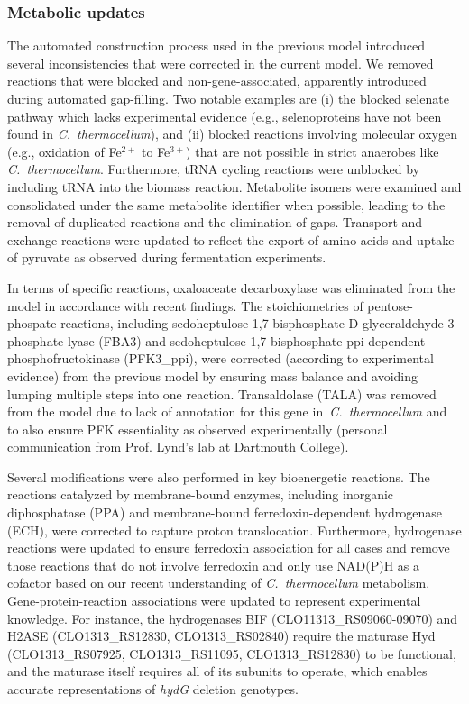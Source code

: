 \subsubsection{Metabolic updates}

The automated construction process used in the previous model introduced several inconsistencies that were corrected in the current model. We removed reactions that were blocked and non-gene-associated, apparently introduced during automated gap-filling. Two notable examples are (i) the blocked selenate pathway which lacks experimental evidence (e.g., selenoproteins have not been found in \textit{C.~thermocellum}), and (ii) blocked reactions involving molecular oxygen (e.g., oxidation of Fe$^{2+}$ to Fe$^{3+}$) that are not possible in strict anaerobes like \textit{C.~thermocellum}. Furthermore, tRNA cycling reactions were unblocked by including tRNA into the biomass reaction.\citep{reimers2017}
Metabolite isomers were examined and consolidated under the same metabolite identifier when possible, leading to the removal of duplicated reactions and the elimination of gaps.
Transport and exchange reactions were updated to reflect the export of amino acids and uptake of pyruvate as observed during fermentation experiments.\citep{holwerda2014}

In terms of specific reactions, oxaloaceate decarboxylase was eliminated from the model in accordance with recent findings.\citep{olson2017}
The stoichiometries of pentose-phospate reactions, including sedoheptulose 1,7-bisphosphate D-glyceraldehyde-3-phosphate-lyase (FBA3) and sedoheptulose 1,7-bisphosphate ppi-dependent phosphofructokinase (PFK3\_ppi), were corrected (according to experimental evidence\citep{rydzak2012}) from the previous model by ensuring mass balance and avoiding lumping multiple steps into one reaction.
Transaldolase (TALA) was removed from the model due to lack of annotation for this gene in \textit{C.~thermocellum} and to also ensure PFK essentiality as observed experimentally (personal communication from Prof. Lynd's lab at Dartmouth College).

Several modifications were also performed in key bioenergetic reactions.
The reactions catalyzed by membrane-bound enzymes, including inorganic diphosphatase (PPA) \citep{zhou2013} and
membrane-bound ferredoxin-dependent hydrogenase (ECH)\citep{calusinska2010},
were corrected to capture proton translocation.
Furthermore, hydrogenase reactions were updated to ensure ferredoxin association for all cases and remove those reactions that do not involve ferredoxin and only use NAD(P)H as a cofactor based on our recent understanding of \textit{C.~thermocellum} metabolism.\citep{biswas2017}
Gene-protein-reaction associations were updated to represent experimental knowledge. For instance, the hydrogenases BIF (CLO11313\_RS09060-09070) and H2ASE (CLO1313\_RS12830, CLO1313\_RS02840) require the maturase Hyd (CLO1313\_RS07925, CLO1313\_RS11095, CLO1313\_RS12830) to be functional, and the maturase itself requires all of its subunits to operate, which enables accurate representations of \textit{hydG} deletion genotypes.\citep{biswas2015}

